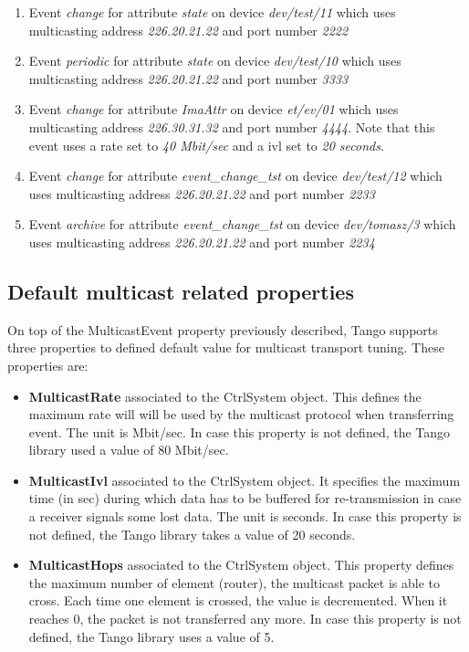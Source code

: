 \begin{enumerate}
\item Event \emph{change} for attribute \emph{state} on device \emph{dev/test/11}
which uses multicasting address \emph{226.20.21.22} and port number
\emph{2222}
\item Event \emph{periodic} for attribute \emph{state} on device \emph{dev/test/10}
which uses multicasting address \emph{226.20.21.22} and port number
\emph{3333}
\item Event \emph{change} for attribute \emph{ImaAttr} on device \emph{et/ev/01}
which uses multicasting address \emph{226.30.31.32} and port number
\emph{4444}. Note that this event uses a rate set to \emph{40 Mbit/sec}
and a ivl set to \emph{20 seconds}.
\item Event \emph{change} for attribute \emph{event\_change\_tst} on device
\emph{dev/test/12} which uses multicasting address \emph{226.20.21.22}
and port number \emph{2233}
\item Event \emph{archive} for attribute \emph{event\_change\_tst} on device
\emph{dev/tomasz/3} which uses multicasting address \emph{226.20.21.22}
and port number \emph{2234}
\end{enumerate}

\subsection{Default multicast related properties}

On top of the MulticastEvent property previously described, Tango
supports three properties to defined default value for multicast transport
tuning. These properties are:
\begin{itemize}
\item \textbf{MulticastRate} associated to the CtrlSystem
object. This defines the maximum rate will will be used by the multicast
protocol when transferring event. The unit is Mbit/sec. In case this
property is not defined, the Tango library used a value of 80 Mbit/sec.
\item \textbf{MulticastIvl} associated to the CtrlSystem
object. It specifies the maximum time (in sec) during which data has
to be buffered for re-transmission in case a receiver signals some
lost data. The unit is seconds. In case this property is not defined,
the Tango library takes a value of 20 seconds.
\item \textbf{MulticastHops} associated to the CtrlSystem
object. This property defines the maximum number of element (router),
the multicast packet is able to cross. Each time one element is crossed,
the value is decremented. When it reaches 0, the packet is not transferred
any more. In case this property is not defined, the Tango library
uses a value of 5.
\end{itemize}

